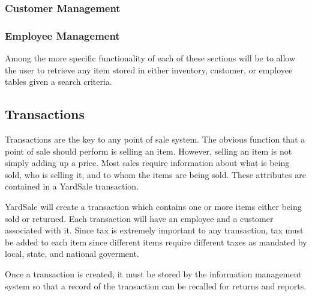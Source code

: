 \documentclass{report}
\begin{document}
    \subsubsection{Customer Management}

    \subsubsection{Employee Management}

    Among the more specific functionality of each of these sections
    will be to allow the user to retrieve any item stored in either
    inventory, customer, or employee tables given a search
    criteria.

    \subsection{Transactions}

    Transactions are the key to any point of sale system.  The obvious
    function that a point of sale should perform is selling an item.
    However, selling an item is not simply adding up a price.  Most sales
    require information about what is being sold, who is selling it, and to whom
    the items are being sold.  These attributes are contained in a YardSale
    transaction.

    YardSale will create a transaction which contains one or more items
    either being sold or returned.  Each transaction will have an employee
    and a customer associated with it.  Since tax is extremely important
    to any transaction, tax must be added to each item since different
    items require different taxes as mandated by local, state, and national
    goverment.

    Once a transaction is created, it must be stored by the information
    management system so that a record of the transaction can be
    recalled for returns and reports.
\end{document}
